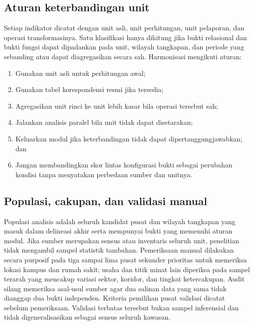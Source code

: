 \documentclass[11pt,a4paper,oneside,openany,indonesian]{report}
\begin{document}
\subsection{Aturan keterbandingan
unit}\label{aturan-keterbandingan-unit}

Setiap indikator dicatat dengan unit asli, unit perhitungan, unit
pelaporan, dan operasi transformasinya. Satu klasifikasi hanya dihitung
jika bukti relasional dan bukti fungsi dapat dipadankan pada unit,
wilayah tangkapan, dan periode yang sebanding atau dapat diagregasikan
secara sah. Harmonisasi mengikuti aturan:

\begin{enumerate}
\def\labelenumi{\arabic{enumi}.}
\tightlist
\item
  Gunakan unit asli untuk perhitungan awal;
\item
  Gunakan tabel korespondensi resmi jika tersedia;
\item
  Agregasikan unit rinci ke unit lebih kasar bila operasi tersebut sah;
\item
  Jalankan analisis paralel bila unit tidak dapat disetarakan;
\item
  Keluarkan modul jika keterbandingan tidak dapat dipertanggungjawabkan;
  dan
\item
  Jangan membandingkan skor lintas konfigurasi bukti sebagai perubahan
  kondisi tanpa menyatakan perbedaan sumber dan unitnya.
\end{enumerate}

\subsection{Populasi, cakupan, dan validasi
manual}\label{populasi-cakupan-dan-validasi-manual}

Populasi analisis adalah seluruh kandidat pusat dan wilayah tangkapan
yang masuk dalam delineasi akhir serta mempunyai bukti yang memenuhi
aturan modul. Jika sumber merupakan sensus atau inventaris seluruh unit,
penelitian tidak mengambil sampel statistik tambahan. Pemeriksaan manual
dilakukan secara purposif pada tiga sampai lima pusat sekunder prioritas
untuk memeriksa lokasi kampus dan rumah sakit; usaha dan titik minat
lain diperiksa pada sampel terarah yang mencakup variasi sektor,
koridor, dan tingkat ketercakupan. Audit silang memeriksa asal-usul
sumber agar dua salinan data yang sama tidak dianggap dua bukti
independen. Kriteria pemilihan pusat validasi dicatat sebelum
pemeriksaan. Validasi terbatas tersebut bukan sampel inferensial dan
tidak digeneralisasikan sebagai sensus seluruh kawasan.
\end{document}
